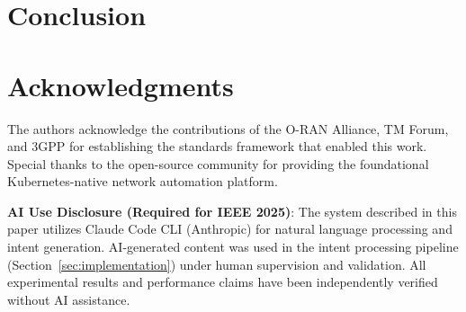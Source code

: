 \documentclass[conference]{IEEEtran}
\begin{document}
\section{Conclusion}
\label{sec:conclusion}




\section*{Acknowledgments}

The authors acknowledge the contributions of the O-RAN Alliance, TM Forum, and 3GPP for establishing the standards framework that enabled this work. Special thanks to the open-source community for providing the foundational Kubernetes-native network automation platform.

\textbf{AI Use Disclosure (Required for IEEE 2025)}: The system described in this paper utilizes Claude Code CLI (Anthropic) for natural language processing and intent generation. AI-generated content was used in the intent processing pipeline (Section~\ref{sec:implementation}) under human supervision and validation. All experimental results and performance claims have been independently verified without AI assistance.





\end{document}
